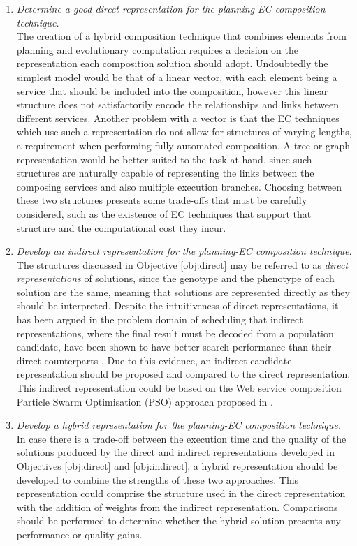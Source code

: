 \begin{enumerate}
 \item \label{obj:direct} \textit{Determine a good direct representation for the planning-EC composition technique.}\\
 The creation of a hybrid composition technique that combines elements from planning and evolutionary computation requires a decision on the representation each composition solution should adopt. Undoubtedly the simplest model would be that of a linear vector, with each element being a service that should be included into the composition, however this linear structure does not satisfactorily encode the relationships and links between different services. Another problem with a vector is that the EC techniques which use such a representation do not allow for structures of varying lengths, a requirement when performing fully automated composition. A tree or graph representation would be better suited to the task at hand, since such structures are naturally capable of representing the links between the composing services and also multiple execution branches. Choosing between these two structures presents some trade-offs that must be carefully considered, such as the existence of EC techniques that support that structure and the computational cost they incur.
 
 \item \label{obj:indirect} \textit{Develop an indirect representation for the planning-EC composition technique.}\\
 The structures discussed in Objective \ref{obj:direct} may be referred to as \textit{direct representations} of solutions, since the genotype and the phenotype of each solution are the same, meaning that solutions are represented directly as they should be interpreted. Despite the intuitiveness of direct representations, it has been argued in the problem domain of scheduling that indirect representations, where the final result must be decoded from a population candidate, have been shown to have better search performance than their direct counterparts \cite{hart2005evolutionary,craenen2001handle}. Due to this evidence, an indirect candidate representation should be proposed and compared to the direct representation. This indirect representation could be based on the Web service composition Particle Swarm Optimisation (PSO) approach proposed in \cite{da2014graph}.
 
 \item \label{obj:hybrid} \textit{Develop a hybrid representation for the planning-EC composition technique.}\\
 In case there is a trade-off between the execution time and the quality of the solutions produced by the direct and indirect representations developed in Objectives \ref{obj:direct} and \ref{obj:indirect}, a hybrid representation should be developed to combine the strengths of these two approaches. This representation could comprise the structure used in the direct representation with the addition of weights from the indirect representation. Comparisons should be performed to determine whether the hybrid solution presents any performance or quality gains.
 

\end{enumerate}

